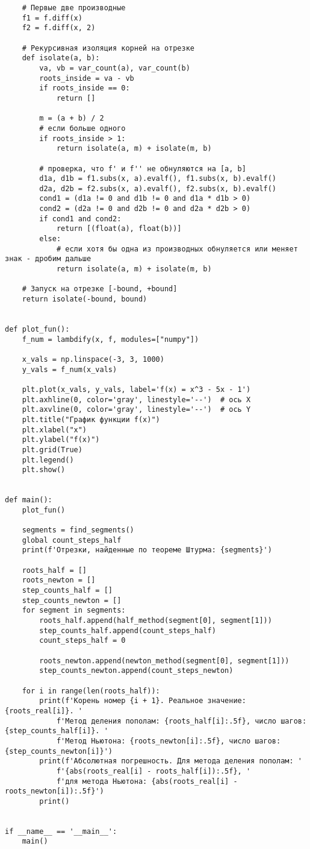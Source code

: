 \documentclass[a4paper, 14pt]{extarticle}
\begin{document}
\begin{verbatim}
	# Первые две производные
	f1 = f.diff(x)
	f2 = f.diff(x, 2)
	
	# Рекурсивная изоляция корней на отрезке
	def isolate(a, b):
		va, vb = var_count(a), var_count(b)
		roots_inside = va - vb
		if roots_inside == 0:
			return []
		
		m = (a + b) / 2
		# если больше одного
		if roots_inside > 1:
			return isolate(a, m) + isolate(m, b)
		
		# проверка, что f' и f'' не обнуляются на [a, b]
		d1a, d1b = f1.subs(x, a).evalf(), f1.subs(x, b).evalf()
		d2a, d2b = f2.subs(x, a).evalf(), f2.subs(x, b).evalf()
		cond1 = (d1a != 0 and d1b != 0 and d1a * d1b > 0)
		cond2 = (d2a != 0 and d2b != 0 and d2a * d2b > 0)
		if cond1 and cond2:
			return [(float(a), float(b))]
		else:
			# если хотя бы одна из производных обнуляется или меняет знак - дробим дальше
			return isolate(a, m) + isolate(m, b)
	
	# Запуск на отрезке [-bound, +bound]
	return isolate(-bound, bound)


def plot_fun():
	f_num = lambdify(x, f, modules=["numpy"])
	
	x_vals = np.linspace(-3, 3, 1000)
	y_vals = f_num(x_vals)
	
	plt.plot(x_vals, y_vals, label='f(x) = x^3 - 5x - 1')
	plt.axhline(0, color='gray', linestyle='--')  # ось X
	plt.axvline(0, color='gray', linestyle='--')  # ось Y
	plt.title("График функции f(x)")
	plt.xlabel("x")
	plt.ylabel("f(x)")
	plt.grid(True)
	plt.legend()
	plt.show()


def main():
	plot_fun()
	
	segments = find_segments()
	global count_steps_half
	print(f'Отрезки, найденные по теореме Штурма: {segments}')
	
	roots_half = []
	roots_newton = []
	step_counts_half = []
	step_counts_newton = []
	for segment in segments:
		roots_half.append(half_method(segment[0], segment[1]))
		step_counts_half.append(count_steps_half)
		count_steps_half = 0
	
		roots_newton.append(newton_method(segment[0], segment[1]))
		step_counts_newton.append(count_steps_newton)
	
	for i in range(len(roots_half)):
		print(f'Корень номер {i + 1}. Реальное значение: {roots_real[i]}. '
			f'Метод деления пополам: {roots_half[i]:.5f}, число шагов: {step_counts_half[i]}. '
			f'Метод Ньютона: {roots_newton[i]:.5f}, число шагов: {step_counts_newton[i]}')
		print(f'Абсолютная погрешность. Для метода деления пополам: '
			f'{abs(roots_real[i] - roots_half[i]):.5f}, '
			f'для метода Ньютона: {abs(roots_real[i] - roots_newton[i]):.5f}')
		print()


if __name__ == '__main__':
	main()

\end{verbatim}
\end{document}
